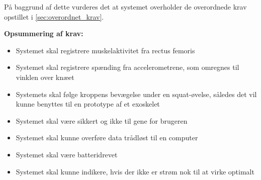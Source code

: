 På baggrund af dette vurderes det at systemet overholder de overordnede krav opstillet i \autoref{sec:overordnet_krav}. 

\vspace{3mm}
\textbf{Opsummering af krav:}
\begin{itemize}
\item[\text{\sffamily \checkmark}] Systemet skal registrere muskelaktivitet fra rectus femoris 
\item[\text{\sffamily \checkmark}] Systemet skal registrere spænding fra accelerometrene, som omregnes til vinklen over knæet
\item[\text{\sffamily \checkmark}] Systemets skal følge kroppens bevægelse under en squat-øvelse, således det vil kunne benyttes til en prototype af et exoskelet
\item[\text{\sffamily \checkmark}] Systemet skal være sikkert og ikke til gene for brugeren 
\item[\text{\sffamily \checkmark}] Systemet skal kunne overføre data trådløst til en computer
\item[\text{\sffamily \checkmark}] Systemet skal være batteridrevet
\item[\text{\sffamily \checkmark}] Systemet skal kunne indikere, hvis der ikke er strøm nok til at virke optimalt
\end{itemize}
